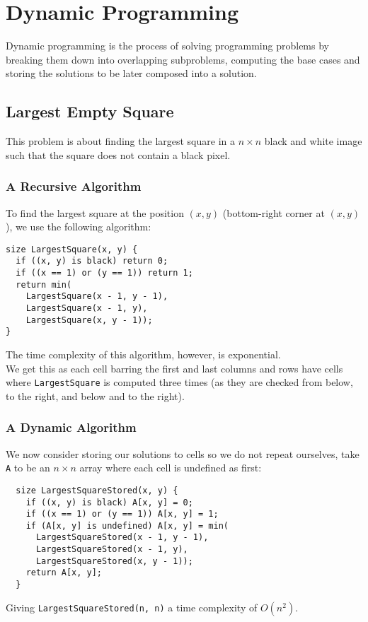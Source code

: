 \section{Dynamic Programming}

Dynamic programming is the process of solving programming problems
by breaking them down into overlapping subproblems,
computing the base cases and storing the solutions to be later
composed into a solution.

\subsection{Largest Empty Square}

This problem is about finding the largest square in a $n \times n$
black and white image such that the square does not contain a black
pixel.

\subsubsection{A Recursive Algorithm}

To find the largest square at the position $(x, y)$ 
(bottom-right corner at $(x, y)$), we use the
following algorithm: \begin{lstlisting}
size LargestSquare(x, y) {
  if ((x, y) is black) return 0;
  if ((x == 1) or (y == 1)) return 1;
  return min(
    LargestSquare(x - 1, y - 1),
    LargestSquare(x - 1, y),
    LargestSquare(x, y - 1));
}
\end{lstlisting} The time complexity of this algorithm, however,
is exponential.
\\[\baselineskip]
We get this as each cell barring the first and last columns and rows 
have cells where \texttt{LargestSquare} is computed three times 
(as they  are checked from below, to the right, and below and to 
the right).

\newpage

\subsubsection{A Dynamic Algorithm}

We now consider storing our solutions to cells so we do not repeat
ourselves, take \texttt{A} to be an $n \times n$ array
where each cell is undefined as first: \begin{lstlisting}
  size LargestSquareStored(x, y) {
    if ((x, y) is black) A[x, y] = 0;
    if ((x == 1) or (y == 1)) A[x, y] = 1;
    if (A[x, y] is undefined) A[x, y] = min(
      LargestSquareStored(x - 1, y - 1),
      LargestSquareStored(x - 1, y),
      LargestSquareStored(x, y - 1));
    return A[x, y];
  }
\end{lstlisting} Giving \texttt{LargestSquareStored(n, n)} a time 
complexity of $O(n^2)$.

